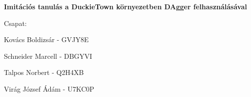 \documentclass{article}
\begin{document}

\begin{center}
\vspace*{15\baselineskip}

{\huge \textbf{Imitációs tanulás a DuckieTown környezetben DAgger felhasználásával}}

\vspace*{3\baselineskip}

\begin{large}
\vspace*{2\baselineskip}

\vspace*{2\baselineskip}

Csapat:

\vspace*{\baselineskip}

Kovács Boldizsár - GVJY8E

\vspace*{\baselineskip}

Schneider Marcell - DBGYVI

\vspace*{\baselineskip}

Talpos Norbert - Q2H4XB

\vspace*{\baselineskip}

Virág József Ádám - U7KC0P

\vspace*{\baselineskip}

\end{large}
\end{center}
\pagebreak

\end{document}
